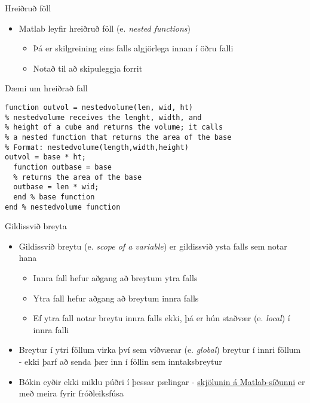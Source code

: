 \documentclass[handout]{beamer}
\begin{document}
\begin{frame}{Hreiðruð föll}
\begin{itemize}
 \item Matlab leyfir hreiðruð föll (e. \emph{nested functions})
 \begin{itemize}
  \item Þá er skilgreining eins falls algjörlega innan í öðru falli
  \item Notað til að skipuleggja forrit
 \end{itemize}
\end{itemize}
\end{frame}

\begin{frame}[fragile]{Dæmi um hreiðrað fall}
\begin{verbatim}
function outvol = nestedvolume(len, wid, ht)
% nestedvolume receives the lenght, width, and
% height of a cube and returns the volume; it calls
% a nested function that returns the area of the base
% Format: nestedvolume(length,width,height)
outvol = base * ht;
  function outbase = base
  % returns the area of the base
  outbase = len * wid;
  end % base function
end % nestedvolume function
\end{verbatim}

\end{frame}


\begin{frame}{Gildissvið breyta}
\vspace{\baselineskip}
\begin{itemize}
 \item Gildissvið breytu (e. \emph{scope of a variable}) er gildissvið ysta falls sem notar hana
 \begin{itemize}
  \item Innra fall hefur aðgang að breytum ytra falls
  \item Ytra fall hefur aðgang að breytum innra falls
  \item Ef ytra fall notar breytu innra falls ekki, þá er hún staðvær (e. \emph{local}) í innra falli
 \end{itemize}
 \item Breytur í ytri föllum virka því sem víðværar (e. \emph{global}) breytur í innri föllum - ekki þarf að senda þær inn í föllin sem inntaksbreytur
 \item Bókin eyðir ekki miklu púðri í þessar pælingar - \href{http://se.mathworks.com/help/matlab/matlab_prog/nested-functions.html?refresh=true}{skjölunin á Matlab-síðunni} er með meira fyrir fróðleiksfúsa
\end{itemize}
\end{frame}
\end{document}
